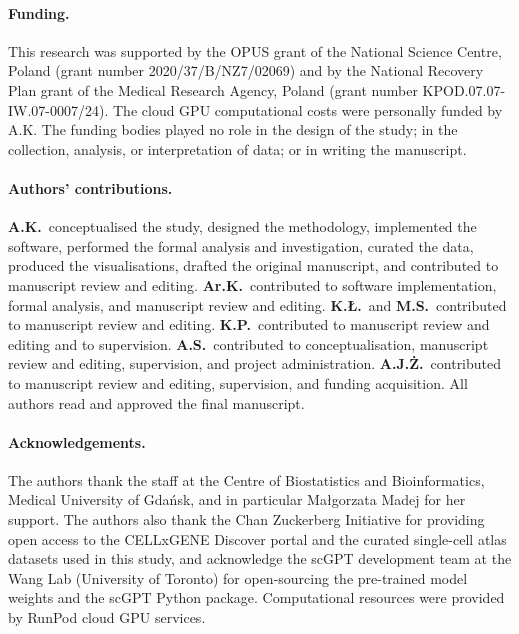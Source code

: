 \documentclass[11pt,a4paper]{article}
\begin{document}
\paragraph{Funding.} This research was supported by the OPUS grant of the National Science Centre, Poland (grant number 2020/37/B/NZ7/02069) and by the National Recovery Plan grant of the Medical Research Agency, Poland (grant number KPOD.07.07-IW.07-0007/24). The cloud GPU computational costs were personally funded by A.K. The funding bodies played no role in the design of the study; in the collection, analysis, or interpretation of data; or in writing the manuscript.

\paragraph{Authors' contributions.}
\textbf{A.K.}~conceptualised the study, designed the methodology, implemented the software, performed the formal analysis and investigation, curated the data, produced the visualisations, drafted the original manuscript, and contributed to manuscript review and editing.
\textbf{Ar.K.}~contributed to software implementation, formal analysis, and manuscript review and editing.
\textbf{K.{\L}.}~and \textbf{M.S.}~contributed to manuscript review and editing.
\textbf{K.P.}~contributed to manuscript review and editing and to supervision.
\textbf{A.S.}~contributed to conceptualisation, manuscript review and editing, supervision, and project administration.
\textbf{A.J.{\.Z}.}~contributed to manuscript review and editing, supervision, and funding acquisition.
All authors read and approved the final manuscript.

\paragraph{Acknowledgements.} The authors thank the staff at the Centre of Biostatistics and Bioinformatics, Medical University of Gda\'nsk, and in particular Ma{\l}gorzata Madej for her support. The authors also thank the Chan Zuckerberg Initiative for providing open access to the CELLxGENE Discover portal and the curated single-cell atlas datasets used in this study, and acknowledge the scGPT development team at the Wang Lab (University of Toronto) for open-sourcing the pre-trained model weights and the scGPT Python package. Computational resources were provided by RunPod cloud GPU services.

\newpage


\end{document}
